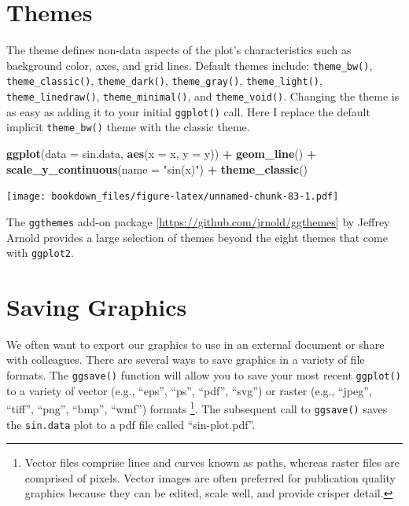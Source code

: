 \documentclass[]{krantz}
\makeatletter
\newenvironment{Shaded}{\begin{snugshade}}{\end{snugshade}}
\newcommand{\KeywordTok}[1]{\textcolor[rgb]{0.27,0.27,0.27}{\textbf{#1}}}
\newcommand{\DataTypeTok}[1]{\textcolor[rgb]{0.27,0.27,0.27}{#1}}
\newcommand{\StringTok}[1]{\textcolor[rgb]{0.5,0.5,0.5}{#1}}
\newcommand{\OperatorTok}[1]{\textcolor[rgb]{0.43,0.43,0.43}{\textbf{#1}}}
\newcommand{\NormalTok}[1]{#1}
\newenvironment{kframe}{%
\medskip{}
\setlength{\fboxsep}{.8em}
 \def\at@end@of@kframe{}%
 \ifinner\ifhmode%
  \def\at@end@of@kframe{\end{minipage}}%
  \begin{minipage}{\columnwidth}%
 \fi\fi%
 \def\FrameCommand##1{\hskip\@totalleftmargin \hskip-\fboxsep
 \colorbox{shadecolor}{##1}\hskip-\fboxsep
     \hskip-\linewidth \hskip-\@totalleftmargin \hskip\columnwidth}%
 \MakeFramed {\advance\hsize-\width
   \@totalleftmargin\z@ \linewidth\hsize
   \@setminipage}}%
 {\par\unskip\endMakeFramed%
 \at@end@of@kframe}
\renewenvironment{Shaded}{\begin{kframe}}{\end{kframe}}
\makeatother
\begin{document}
\section{Themes}\label{themes}

The theme defines non-data aspects of the plot's characteristics such as
background color, axes, and grid lines. Default themes include:
\texttt{theme\_bw()}, \texttt{theme\_classic()}, \texttt{theme\_dark()},
\texttt{theme\_gray()}, \texttt{theme\_light()},
\texttt{theme\_linedraw()}, \texttt{theme\_minimal()}, and
\texttt{theme\_void()}. Changing the theme is as easy as adding it to
your initial \texttt{ggplot()} call. Here I replace the default implicit
\texttt{theme\_bw()} theme with the classic theme.

\begin{Shaded}
\begin{Highlighting}[]
\KeywordTok{ggplot}\NormalTok{(}\DataTypeTok{data =}\NormalTok{ sin.data, }\KeywordTok{aes}\NormalTok{(}\DataTypeTok{x =}\NormalTok{ x, }\DataTypeTok{y =}\NormalTok{ y)) }\OperatorTok{+}\StringTok{ }\KeywordTok{geom_line}\NormalTok{() }\OperatorTok{+}\StringTok{ }
\StringTok{    }\KeywordTok{scale_y_continuous}\NormalTok{(}\DataTypeTok{name =} \StringTok{"sin(x)"}\NormalTok{) }\OperatorTok{+}
\StringTok{    }\KeywordTok{theme_classic}\NormalTok{()}
\end{Highlighting}
\end{Shaded}

\texttt{[image: bookdown\_files/figure-latex/unnamed-chunk-83-1.pdf]}

The \texttt{ggthemes} add-on package
{[}\url{https://github.com/jrnold/ggthemes}{]} by Jeffrey Arnold
provides a large selection of themes beyond the eight themes that come
with \texttt{ggplot2}.

\section{Saving Graphics}\label{saving-graphics}

We often want to export our graphics to use in an external document or
share with colleagues. There are several ways to save graphics in a
variety of file formats. The \texttt{ggsave()} function will allow you
to save your most recent \texttt{ggplot()} to a variety of vector (e.g.,
``eps'', ``ps'', ``pdf'', ``svg'') or raster (e.g., ``jpeg'', ``tiff'',
``png'', ``bmp'', ``wmf'') formats \footnote{Vector files comprise lines
  and curves known as paths, whereas raster files are comprised of
  pixels. Vector images are often preferred for publication quality
  graphics because they can be edited, scale well, and provide crisper
  detail.}. The subsequent call to \texttt{ggsave()} saves the
\texttt{sin.data} plot to a pdf file called ``sin-plot.pdf''.
\end{document}
